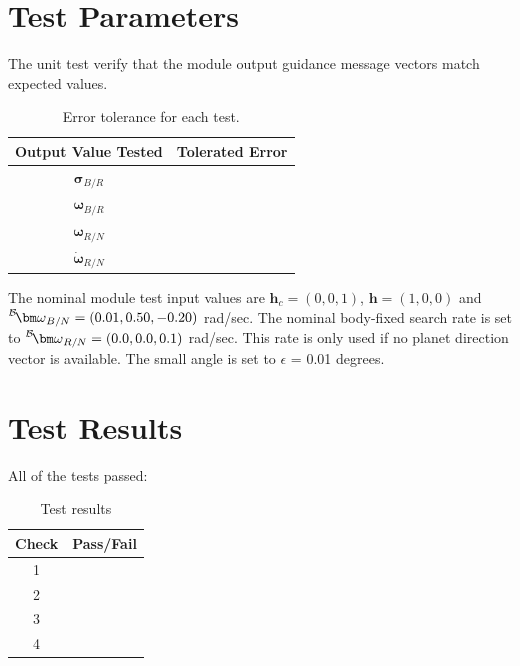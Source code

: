 \section{Test Parameters}
The unit test verify that the module output guidance message vectors match expected values.
\begin{table}[htbp]
	\caption{Error tolerance for each test.}
	\label{tab:errortol}
	\centering \fontsize{10}{10}\selectfont
	\begin{tabular}{ c | c } %
		\hline\hline
		\textbf{Output Value Tested}  & \textbf{Tolerated Error}  \\
		\hline
		$\bm\sigma_{B/R}$        & 	   \\
		$\bm\omega_{B/R}$        & \\
		$\bm\omega_{R/N}$        &  \\
		$\dot{\bm\omega}_{R/N}$        &   \\
		\hline\hline
	\end{tabular}
\end{table}

The nominal module test input values are $\hat{\bm h}_{c} = (0,0,1)$, $\bm h = (1,0,0)$ and $\leftexp{B}{\bm\omega}_{B/N} = (0.01, 0.50, -0.20)$ rad/sec.  The nominal body-fixed search rate is set to $\leftexp{B}{\bm\omega}_{R/N} = (0.0, 0.0, 0.1)$ rad/sec.  This rate is only used if no planet direction vector is available.  The small angle is set to $\epsilon$ = 0.01 degrees.



\section{Test Results}

All of the tests passed:
\begin{table}[H]
	\caption{Test results}
	\label{tab:results}
	\centering \fontsize{10}{10}\selectfont
	\begin{tabular}{c | c  } %
		\hline\hline
		\textbf{Check} 						  		&\textbf{Pass/Fail} \\
		\hline
	   1	   			&  \\
	   2	   			&  \\
	   3	   			&  \\
	   4	   			&  \\
	   \hline\hline
	\end{tabular}
\end{table}
